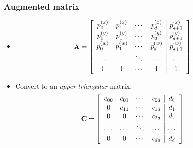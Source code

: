 \documentclass{beamer}
\begin{document}
\begin{frame}
\frametitle{Augmented matrix}
\begin{itemize}[<+->]
\item	\begin{equation*}
		\mathbf{A}=
		\left[ \begin{array}{c c c c | c}
			\vspace{1pt}p_0^{(x)}&p_1^{(x)}&\cdots&p_d^{(x)}&p_{d+1}^{(x)}\\
			\vspace{1pt}p_0^{(y)}&p_1^{(y)}&\cdots&p_d^{(y)}&p_{d+1}^{(y)}\\
			\vspace{1pt}p_0^{(w)}&p_1^{(w)}&\cdots&p_d^{(w)}&p_{d+1}^{(w)}\\
			\vspace{1pt}\cdots&\cdots&\ddots&\cdots&\cdots\\
			\vspace{1pt}1&1&\cdots&1&1
		\end{array}\right]
		\end{equation*}
\item	Convert to an \emph{upper triangular} matrix.
		\begin{equation*}
		\mathbf{C}=
		\left[ \begin{array}{c c c c | c}
			\vspace{1pt} c_{00}&c_{01}&\cdots&c_{0d}&d_0\\
			\vspace{1pt} 0&c_{11}&\cdots&c_{1d}&d_1\\
			\vspace{1pt} 0&0&\cdots&c_{2d}&d_2\\
			\vspace{1pt}\cdots&\cdots&\ddots&\cdots&\cdots\\
			\vspace{1pt}0&0&\cdots&c_{dd}&d_d
		\end{array}\right]
		\end{equation*}
\end{itemize}
\end{frame}
\end{document}
